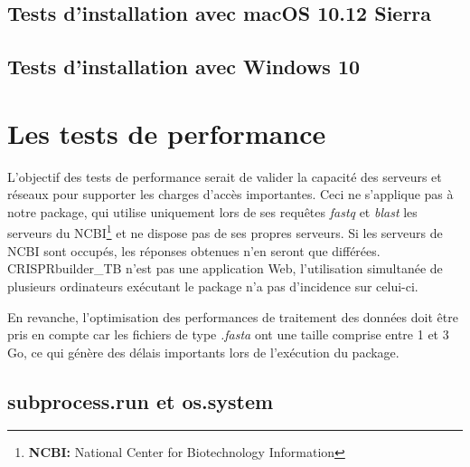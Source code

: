 \documentclass[twoside,a4paper,11pt,frenchb,openany]{report}
\begin{document}
\subsection{Tests d'installation avec macOS 10.12 Sierra}








\subsection{Tests d'installation avec Windows 10}










\section{Les tests de performance}

L'objectif des tests de performance serait de valider la capacité des serveurs et réseaux pour supporter les charges d'accès importantes. Ceci ne s'applique pas à notre package, qui utilise uniquement lors de ses requêtes \textit{fastq} et \textit{blast} les serveurs du NCBI\footnote{\textbf{NCBI:} National Center for Biotechnology Information} et ne dispose pas de ses propres serveurs. Si les serveurs de NCBI sont occupés, les réponses obtenues n'en seront que différées. CRISPRbuilder\_TB n'est pas une application Web, l'utilisation simultanée de plusieurs ordinateurs exécutant le package n'a pas d'incidence sur celui-ci.

En revanche, l'optimisation des performances de traitement des données doit être pris en compte car les fichiers de type \textit{.fasta} ont une taille comprise entre 1 et 3 Go, ce qui génère des délais importants lors de l'exécution du package.



\subsection{subprocess.run et os.system}
\end{document}
